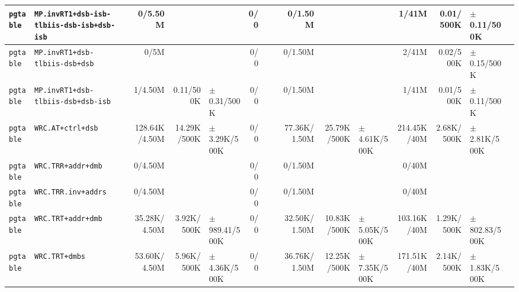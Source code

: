 \begin{tabular}{l l  | r r l | r r l | r r l | r r l l}
        \verb|pgtable| &             \verb|MP.invRT1+dsb-isb-tlbiis-dsb-isb+dsb-isb| &        0/5.50M &                       &                   &            0/0 &                       &  &        0/1.50M &                       &                   &          1/41M &             0.01/500K &    $\pm$ 0.11/500K & \\ \hline 
        \verb|pgtable| &                         \verb|MP.invRT1+dsb-tlbiis-dsb+dsb| &           0/5M &                       &                   &            0/0 &                       &  &        0/1.50M &                       &                   &          2/41M &             0.02/500K &    $\pm$ 0.15/500K & \\ \hline 
        \verb|pgtable| &                     \verb|MP.invRT1+dsb-tlbiis-dsb+dsb-isb| &        1/4.50M &             0.11/500K &   $\pm$ 0.31/500K &            0/0 &                       &  &        0/1.50M &                       &                   &          1/41M &             0.01/500K &    $\pm$ 0.11/500K & \\ \hline 
        \verb|pgtable| &                                      \verb|WRC.AT+ctrl+dsb| &  128.64K/4.50M &           14.29K/500K &  $\pm$ 3.29K/500K &            0/0 &                       &  &   77.36K/1.50M &           25.79K/500K &  $\pm$ 4.61K/500K &    214.45K/40M &            2.68K/500K &   $\pm$ 2.81K/500K & \\ \hline 
        \verb|pgtable| &                                     \verb|WRC.TRR+addr+dmb| &        0/4.50M &                       &                   &            0/0 &                       &  &        0/1.50M &                       &                   &          0/40M &                       &                    & \\ \hline 
        \verb|pgtable| &                                    \verb|WRC.TRR.inv+addrs| &        0/4.50M &                       &                   &            0/0 &                       &  &        0/1.50M &                       &                   &          0/40M &                       &                    & \\ \hline 
        \verb|pgtable| &                                     \verb|WRC.TRT+addr+dmb| &   35.28K/4.50M &            3.92K/500K & $\pm$ 989.41/500K &            0/0 &                       &  &   32.50K/1.50M &           10.83K/500K &  $\pm$ 5.05K/500K &    103.16K/40M &            1.29K/500K &  $\pm$ 802.83/500K & \\ \hline 
        \verb|pgtable| &                                         \verb|WRC.TRT+dmbs| &   53.60K/4.50M &            5.96K/500K &  $\pm$ 4.36K/500K &            0/0 &                       &  &   36.76K/1.50M &           12.25K/500K &  $\pm$ 7.35K/500K &    171.51K/40M &            2.14K/500K &   $\pm$ 1.83K/500K & \\ \hline 

\end{tabular}
